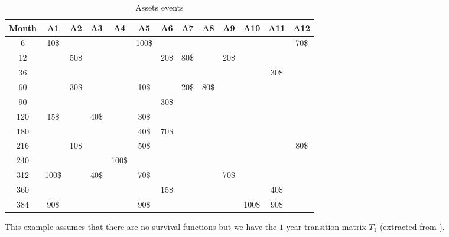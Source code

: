 \documentclass[a4paper,12pt,final]{article}
\begin{document}
{\small
\begin{table}[!hb]
\begin{center}
\begin{tabular}[]{c|c|c|c|c|c|c|c|c|c|c|c|c}
Month & A1  & A2  & A3  & A4  & A5  & A6  & A7  & A8  & A9  & A10 & A11 & A12  \\
\hline
6     & 10\$&     &     &     &100\$&     &     &     &     &     &     & 70\$ \\
12    &     & 50\$&     &     &     & 20\$& 80\$&     & 20\$&     &     &      \\
36    &     &     &     &     &     &     &     &     &     &     & 30\$&      \\
60    &     & 30\$&     &     & 10\$&     & 20\$& 80\$&     &     &     &      \\
90    &     &     &     &     &     & 30\$&     &     &     &     &     &      \\
120   & 15\$&     & 40\$&     & 30\$&     &     &     &     &     &     &      \\
180   &     &     &     &     & 40\$& 70\$&     &     &     &     &     &      \\
216   &     & 10\$&     &     & 50\$&     &     &     &     &     &     & 80\$ \\
240   &     &     &     &100\$&     &     &     &     &     &     &     &      \\
312   &100\$&     & 40\$&     & 70\$&     &     &     & 70\$&     &     &      \\
360   &     &     &     &     &     & 15\$&     &     &     &     & 40\$&      \\
384   & 90\$&     &     &     & 90\$&     &     &     &     &100\$& 90\$&      \\       
\end{tabular}
\caption{Assets events}
\label{example.assets}
\end{center}
\end{table}
}

This example assumes that there are no survival functions but we have the 
$1$-year transition matrix $T_1$ (extracted from \cite{CreditMetrics:Tech_Doc}).
\end{document}
